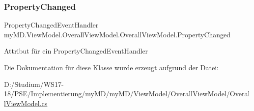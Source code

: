 \subsubsection{\texorpdfstring{Property\+Changed}{PropertyChanged}}
{\footnotesize\ttfamily Property\+Changed\+Event\+Handler my\+M\+D.\+View\+Model.\+Overall\+View\+Model.\+Overall\+View\+Model.\+Property\+Changed}



Attribut für ein Property\+Changed\+Event\+Handler 



Die Dokumentation für diese Klasse wurde erzeugt aufgrund der Datei\+:\begin{DoxyCompactItemize}
\item 
D\+:/\+Studium/\+W\+S17-\/18/\+P\+S\+E/\+Implementierung/my\+M\+D/my\+M\+D/\+View\+Model/\+Overall\+View\+Model/\mbox{\hyperlink{_overall_view_model_8cs}{Overall\+View\+Model.\+cs}}\end{DoxyCompactItemize}
